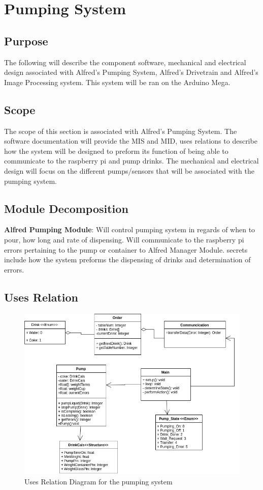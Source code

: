 \documentclass [10pt]{article}
\begin{document}
\section {Pumping System}

\subsection{Purpose}
The following will describe the component software, mechanical and electrical design associated with Alfred's Pumping System, Alfred's Drivetrain and Alfred's Image Processing system. This system will be ran on the Arduino Mega.
\subsection{Scope}

The scope of this section is associated with Alfred's Pumping System. The software documentation will provide the MIS and MID, uses relations to describe how the system will be designed to preform its function of being able to communicate to the raspberry pi and pump drinks. The mechanical and electrical design will focus on the different pumps/sensors that will be associated with the pumping system.


\subsection{Module Decomposition}

\textbf{Alfred Pumping Module}: Will control pumping system in regards of when to pour, how long and rate of dispensing. Will communicate to the raspberry pi errors pertaining to the pump or container to Alfred Manager Module. secrets include how the system preforms the dispensing of drinks and determination of errors.

\subsection{Uses Relation}
\begin{figure} [h!]
	\centering
	\includegraphics [scale = 0.4] {figures/Pumping_UsesDiagram.png}
	\caption{Uses Relation Diagram for the pumping system}
\end{figure}
\end{document}
